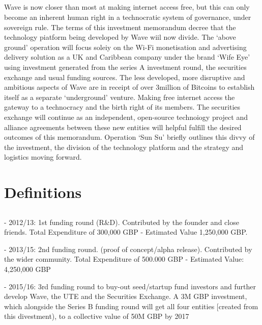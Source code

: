 \documentclass[letterpaper,10pt,openany,oneside,english]{sphinxmanual}
\begin{document}
\subsection{}
\label{\detokenize{overview:conclusion}}
Wave is now closer than most at making internet access free, but this can only become an inherent human right in a technocratic system of governance, under sovereign rule. The terms of this investment memorandum decree that the technology piatform being developed by Wave wiil now divide. The ‘above ground’ operation will focus soleiy on the Wi-Fi monetisation and advertising delivery solution as a UK and Caribbean company under the brand ‘Wife Eye’ using investment generated from the series A investment round, the securities exchange and usual funding sources. The less developed, more disruptive and ambitious aspects of Wave are in receipt of over 3million of Bitcoins to establish itself as a separate ‘underground’ venture. Making free internet access the gateway to a technocracy and the birth right of its members. The securities exchange will continue as an independent, open-source technoiogy project and alliance agreements between these new entities will helpful fulfill the desired outcomes of this memorandum. Operation ‘Sun Su’ briefly outlines this divvy of the investment, the division of the technology platform and the strategy and logistics moving forward.


\section{Definitions}
\label{\detokenize{overview:definitions}}

\subsection{}
\label{\detokenize{overview:glossary}}
 - 2012/13: 1st funding round (R\&D). Contributed by the founder and close friends. Total Expenditure of 300,000 GBP - Estimated Value 1,250,000 GBP.

 - 2013/15: 2nd funding round. (proof of concept/alpha release). Contributed by the wider community. Total Expenditure of 500.000 GBP - Estimated Value: 4,250,000 GBP

 - 2015/16: 3rd funding round to buy-out seed/startup fund investors and further develop Wave, the UTE and the Securities Exchange. A 3M GBP investment, which alongside the Series B funding round will get all four entities {[}created from this divestment), to a collective value of 50M GBP by 2017
\end{document}
